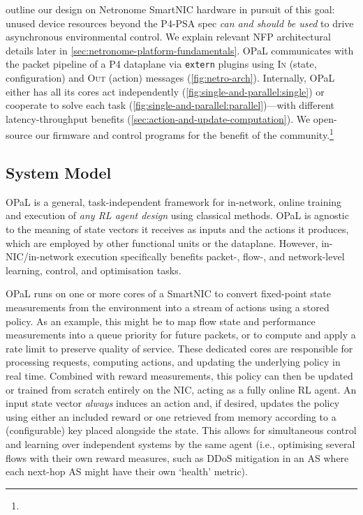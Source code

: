 \documentclass[
sigconf,natbib=false
,anonymous=true
,10pt
]{acmart}
\newcommand{\approachshort}{OPaL}
\newcommand{\inring}{\textsc{In}}
\newcommand{\outring}{\textsc{Out}}
\begin{document}
 outline our design on Netronome SmartNIC hardware in pursuit of this goal: unused device resources beyond the P4-PSA spec \emph{can and should be used} to drive asynchronous environmental control.
We explain relevant NFP architectural details later in \cref{sec:netronome-platform-fundamentals}.
\approachshort{} communicates with the packet pipeline of a P4 dataplane via \texttt{extern} plugins using \inring{} (state, configuration) and \outring{} (action) messages (\cref{fig:netro-arch}).
Internally, \approachshort{} either has all its cores act independently (\cref{fig:single-and-parallel:single}) or cooperate to solve each task (\cref{fig:single-and-parallel:parallel})---with different latency-throughput benefits (\cref{sec:action-and-update-computation}).
We open-source our firmware and control programs for the benefit of the community.\footnote{}

\subsection{System Model}
\approachshort{} is a general, task-independent framework for in-network, online training and execution of \emph{any RL agent design} using classical methods.
\approachshort{} is agnostic to the meaning of state vectors it receives as inputs and the actions it produces, which are employed by other functional units or the dataplane.
However, in-NIC/in-network execution specifically benefits packet-, flow-, and network-level learning, control, and optimisation tasks.

\approachshort{} runs on one or more cores of a SmartNIC to convert fixed-point state measurements from the environment into a stream of actions using a stored policy.
As an example, this might be to map flow state and performance measurements into a queue priority for future packets, or to compute and apply a rate limit to preserve quality of service.
These dedicated cores are responsible for processing requests, computing actions, and updating the underlying policy in real time.
Combined with reward measurements, this policy can then be updated or trained from scratch entirely on the NIC, acting as a fully online RL agent.
An input state vector \emph{always} induces an action and, if desired, updates the policy using either an included reward or one retrieved from memory according to a (configurable) key placed alongside the state.
This allows for simultaneous control and learning over independent systems by the same agent (i.e., optimising several flows with their own reward measures, such as DDoS mitigation in an AS where each next-hop AS might have their own `health' metric).
\end{document}
